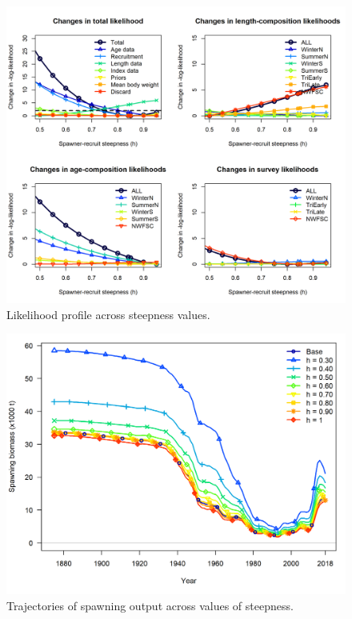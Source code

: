 \documentclass[12pt,]{article}
\begin{document}
\FloatBarrier

\begin{figure}
\centering
\includegraphics{Figures/piner_panel_h.png}
\caption{Likelihood profile across steepness values.
\label{fig:piner_h}}
\end{figure}

\FloatBarrier

\begin{figure}
\centering
\includegraphics{Figures/h_trajectories_ssb.png}
\caption{Trajectories of spawning output across values of steepness.
\label{fig:h_ssb_trajectory}}
\end{figure}
\end{document}
